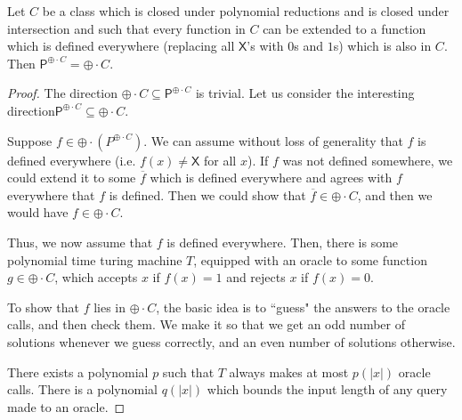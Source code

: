 \documentclass[11pt]{article}
\newcommand{\parity}{\oplus}
\newcommand{\p}{\textsf{P}}
\newcommand{\x}{\textsf{X}}
\begin{document}
\begin{theorem}\label{oracleparityc}
Let $C$ be a class which is closed under polynomial reductions and is closed under intersection and such that every function in $C$ can be extended to a function which is defined everywhere (replacing all \emph{$\x$}'s with $0$s and $1$s) which is also in $C$. Then \emph{$ \p^{\parity \cdot C} = \parity \cdot C$}.
\end{theorem}
\begin{proof}
The direction $\parity \cdot C \subseteq \p^{\parity \cdot C}$ is trivial. Let us consider the interesting direction\linebreak $\p^{\parity \cdot C}\subseteq \parity\cdot C$.

Suppose $f \in \parity \cdot (P^{\parity\cdot C})$. We can assume without loss of generality that $f$ is defined everywhere (i.e. $f(x) \ne \x$ for all $x$). If $f$ was not defined somewhere, we could extend it to some $\overline{f}$ which is defined everywhere and agrees with $f$ everywhere that $f$ is defined. Then we could show that $\overline{f} \in \parity \cdot C$, and then we would have $f \in \parity \cdot C$.

Thus, we now assume that $f$ is defined everywhere. Then, there is some polynomial time turing machine $T$, equipped with an oracle to some function $g\in \parity\cdot C$, which accepts $x$ if $f(x) = 1$ and rejects $x$ if $f(x) = 0$.

To show that $f$ lies in $\parity\cdot C$, the basic idea is to ``guess" the answers to the oracle calls, and then check them. We make it so that we get an odd number of solutions whenever we guess correctly, and an even number of solutions otherwise.

There exists a polynomial $p$ such that $T$ always makes at most $p(|x|)$ oracle calls. There is a polynomial $q(|x|)$ which bounds the input length of any query made to an oracle.


\end{proof}
\end{document}
